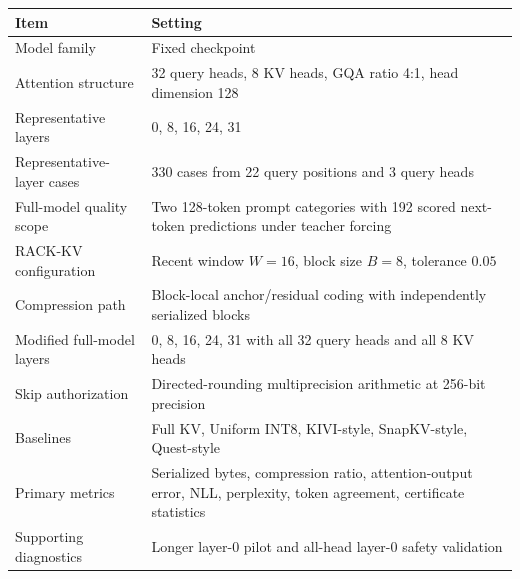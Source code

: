 \begin{threeparttable}
\begin{tabularx}{\linewidth}{@{}lX@{}}
\toprule
Item & Setting \\
\midrule
Model family & Fixed \modeldisplay{} checkpoint \\
Attention structure & 32 query heads, 8 KV heads, GQA ratio 4:1, head dimension 128 \\
Representative layers & 0, 8, 16, 24, 31 \\
Representative-layer cases & 330 cases from 22 query positions and 3 query heads \\
Full-model quality scope & Two 128-token prompt categories with 192 scored next-token predictions under teacher forcing \\
RACK-KV configuration & Recent window \(W=16\), block size \(B=8\), tolerance \(0.05\) \\
Compression path & Block-local anchor/residual coding with independently serialized blocks \\
Modified full-model layers & 0, 8, 16, 24, 31 with all 32 query heads and all 8 KV heads \\
Skip authorization & Directed-rounding multiprecision arithmetic at 256-bit precision \\
Baselines & Full KV, Uniform INT8, KIVI-style, SnapKV-style, Quest-style \\
Primary metrics & Serialized bytes, compression ratio, attention-output error, NLL, perplexity, token agreement, certificate statistics \\
Supporting diagnostics & Longer layer-0 pilot and all-head layer-0 safety validation \\
\bottomrule
\end{tabularx}
\end{threeparttable}
